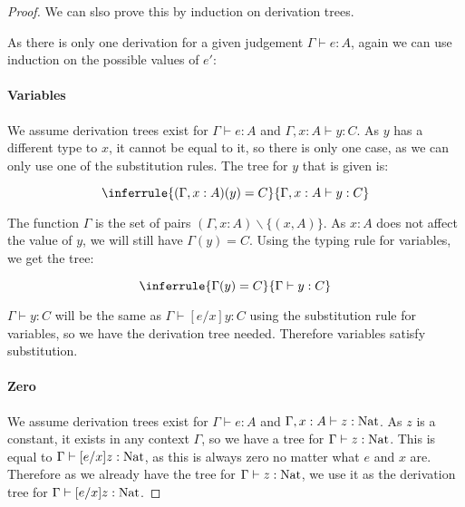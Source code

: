 \begin{proof}
We can slso prove this by induction on derivation trees. %


As there is only one derivation for a given judgement $\Gamma \vdash e : A$, again we can use induction on the possible values of $e'$:

\paragraph{Variables} We assume derivation trees exist for $\Gamma \vdash e : A$ and $\Gamma, x : A \vdash y : C$. As $y$ has a different type to $x$, it cannot be equal to it, so there is only one case, as we can only use one of the substitution rules. The tree for $y$ that is given is:

$$\inferrule{(\Gamma,x:A)(y) = C}{\Gamma, x:A \vdash y : C}$$

The function $\Gamma$ is the set of pairs $(\Gamma,x:A)\backslash \{(x,A)\}$. As $x:A$ does not affect the value of $y$, we will still have $\Gamma(y) = C$. Using the typing rule for variables, we get the tree:

$$\inferrule{\Gamma(y) = C}{\Gamma \vdash y : C}$$

$\Gamma \vdash y : C$ will be the same as $\Gamma \vdash [e/x]y : C$ using the substitution rule for variables, so we have the derivation tree needed. Therefore variables satisfy substitution.  

\paragraph{Zero} We assume derivation trees exist for $\Gamma \vdash e : A$ and $\Gamma, x : A \vdash z : \operatorname{Nat}$. As $z$ is a constant, it exists in any context $\Gamma$, so we have a tree for $\Gamma \vdash z : \operatorname{Nat}$. This is equal to $\Gamma \vdash [e/x]z : \operatorname{Nat}$, as this is always zero no matter what $e$ and $x$ are. Therefore as we already have the tree for $\Gamma \vdash z : \operatorname{Nat}$, we use it as the derivation tree for $\Gamma \vdash [e/x]z : \operatorname{Nat}$.


\end{proof}
